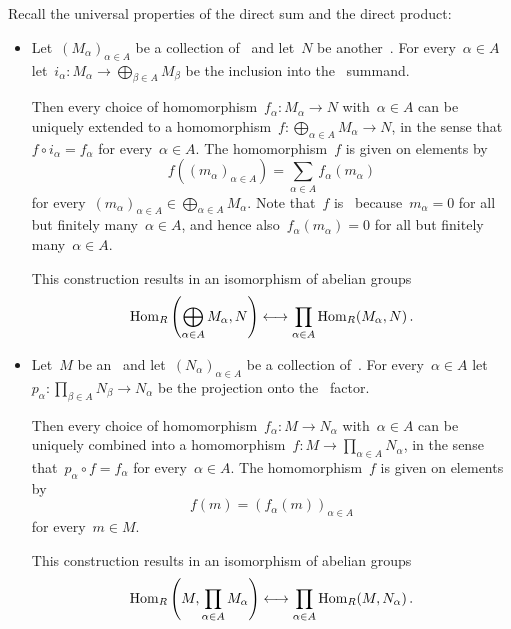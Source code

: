 \section{}

Recall the universal properties of the direct sum and the direct product:

\begin{itemize}
  \item
    Let~$(M_\alpha)_{\alpha \in A}$ be a collection of~{} and let~$N$ be another~{}.
    For every~$\alpha \in A$ let~$i_\alpha \colon M_\alpha \to \bigoplus_{\beta \in A} M_\beta$ be the inclusion into the~ summand.
    
    Then every choice of homomorphism~$f_\alpha \colon M_\alpha \to N$ with~$\alpha \in A$ can be uniquely extended to a homomorphism~$f \colon \bigoplus_{\alpha \in A} M_\alpha \to N$, in the sense that~$f \circ i_\alpha = f_\alpha$ for every~$\alpha \in A$.
    The homomorphism~$f$ is given on elements by
    \[
        f\left( (m_\alpha)_{\alpha \in A} \right)
      = \sum_{\alpha \in A} f_\alpha(m_\alpha)
    \]
    for every~$(m_\alpha)_{\alpha \in A} \in \bigoplus_{\alpha \in A} M_\alpha$.
    Note that~$f$ is~{\welldef} because~$m_\alpha = 0$ for all but finitely many~$\alpha \in A$, and hence also~$f_\alpha(m_\alpha) = 0$ for all but finitely many~$\alpha \in A$.
    
    This construction results in an isomorphism of abelian groups
    \[
        \operatorname{Hom}_R\left( \bigoplus_{\alpha \in A} M_\alpha, N \right)
      \longleftrightarrow
        \prod_{\alpha \in A} \operatorname{Hom}_R(M_\alpha, N) \,.
    \]
  \item
    Let~$M$ be an~{} and let~$(N_\alpha)_{\alpha \in A}$ be a collection of~{}.
    For every~$\alpha \in A$ let~$p_\alpha \colon \prod_{\beta \in A} N_\beta \to N_\alpha$ be the projection onto the~ factor.
    
    Then every choice of homomorphism~$f_\alpha \colon M \to N_\alpha$ with~$\alpha \in A$ can be uniquely combined into a homomorphism~$f \colon M \to \prod_{\alpha \in A} N_\alpha$, in the sense that~$p_\alpha \circ f = f_\alpha$ for every~$\alpha \in A$.
    The homomorphism~$f$ is given on elements by
    \[
        f(m)
      = ( f_\alpha(m) )_{\alpha \in A}
    \]
    for every~$m \in M$.
    
    This construction results in an isomorphism of abelian groups
    \begin{equation}
      \label{iso for product}
        \operatorname{Hom}_R\left( M, \prod_{\alpha \in A} M_\alpha \right)
      \longleftrightarrow
        \prod_{\alpha \in A} \operatorname{Hom}_R(M, N_\alpha) \,.
    \end{equation}
\end{itemize}

